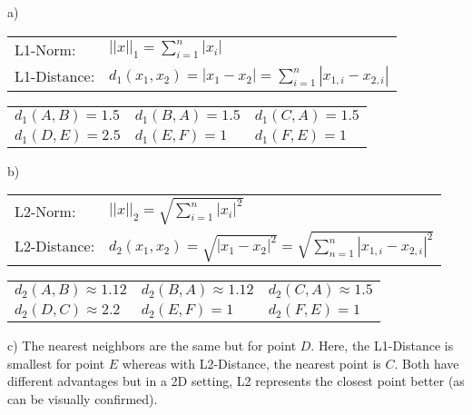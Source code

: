 %
%
%
%
\begin{flushleft}a)\end{flushleft}
\begin{table}[!h]
\begin{tabular}{ll}
  L1-Norm: & $||x||_1 = \sum_{i=1}^n |x_i|$ \\
  L1-Distance: & $d_1(x_1,x_2) = |x_1 - x_2| = \sum_{i=1}^n |x_{1,i} - x_{2,i}|$ 
\end{tabular}
\end{table}
\begin{table}[!h]
\begin{tabular}{lll}
  $d_1(A,B) = 1.5$ & $d_1(B,A) = 1.5$ & $d_1(C,A) = 1.5$ \\
  $d_1(D,E) = 2.5$ & $d_1(E,F) = 1$ & $d_1(F,E) = 1$
\end{tabular}
\end{table}
%
\begin{flushleft}b)\end{flushleft}
\begin{table}[!h]
\begin{tabular}{ll}
  L2-Norm: & $||x||_2 = \sqrt{\sum_{i=1}^n |x_i|^2}$ \\
  L2-Distance: & $d_2(x_1,x_2) = \sqrt{|x_1-x_2|^2} = \sqrt{\sum_{n=1}^n |x_{1,i} - x_{2,i}|^2} $
\end{tabular}
\end{table}
\begin{table}[!h]
\begin{tabular}{lll}
  $d_2(A,B) \approx 1.12$ & $d_2(B,A) \approx 1.12$ & $d_2(C,A) \approx 1.5$ \\
  $d_2(D,C) \approx 2.2$ & $d_2(E,F) = 1$ & $d_2(F,E) = 1$ 
\end{tabular}
\end{table}
%
\begin{flushleft}
c) The nearest neighbors are the same but for point $D$. Here, the L1-Distance is smallest for point $E$ whereas with L2-Distance, the nearest point is $C$. Both have different advantages but in a 2D setting, L2 represents the closest point better (as can be visually confirmed).
\end{flushleft}

